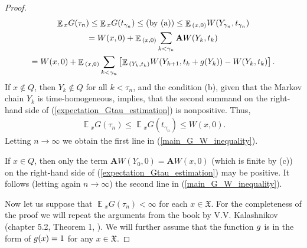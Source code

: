 \documentclass[10pt, reqno]{amsart}
\theoremstyle{definition}
\newcommand{\aasVar}{Q} %
\newcommand{\astVar}{\tau} %
\newcommand{\gtfVar}{G} %
\newcommand{\wtfVar}{W} %
\newcommand{\atoVar}{\mathbf{A}} %
\newcommand{\assVar}{\mathfrak{X}} %
\DeclareMathOperator*{\E}{\mathbb{E}}
\begin{document}
\begin{proof}
		\begin{gather}
		\E{}_{x}\gtfVar(\astVar_{n}) \leq \E{}_{x}\gtfVar(t_{\gamma_{n}}) \leq \text{(by (a))} \leq \E{}_{(x, 0)}\wtfVar(Y_{\gamma_{n}}, t_{\gamma_{n}}) \notag \notag\\ = \wtfVar(x, 0) + \E{}_{(x, 0)}\sum_{k < \gamma_{n}}\atoVar\wtfVar(Y_{k}, t_{k}) \notag\\ = \wtfVar(x, 0) + \E{}_{(x, 0)}\sum_{k < \gamma_{n}}\left[\E{}_{(Y_{k}, t_{k})}\wtfVar(Y_{k+1}, t_{k}+\gffVar(Y_{k})) - \wtfVar(Y_{k}, t_{k})\right].
		\label{expectation_Gtau_estimation}
		\end{gather}
		If $x \notin \aasVar$, then $Y_{k} \notin \aasVar$ for all $k < \astVar_{n}$, and the condition (b), given that the Markov chain $Y_{k}$ is time-homogeneous, implies, that the second summand on the right-hand side of (\ref{expectation_Gtau_estimation}) is nonpositive. Thus,
		\begin{gather*}
		\E{}_{x}\gtfVar(\astVar_{n}) \leq \E{}_{x}\gtfVar(t_{\gamma_{n}}) \leq \wtfVar(x, 0).
		\end{gather*}
		Letting $n \xrightarrow{} \infty$ we obtain the first line in (\ref{main_G_W_inequality}).
		
		If $x \in \aasVar$, then only the term $\atoVar\wtfVar(Y_{0}, 0) = \atoVar\wtfVar(x, 0)$ (which is finite by (c)) on the right-hand side of (\ref{expectation_Gtau_estimation}) may be positive. It follows (letting again $n \xrightarrow{} \infty$) the second line in (\ref{main_G_W_inequality}).
		
		Now let us suppose that $\E{}_{x}\gtfVar(\astVar_{n}) < \infty$ for each $x \in \assVar$. For the completeness of the proof we will repeat the arguments from the book by V.V. Kalashnikov (chapter 5.2, Theorem 1, \cite{Kalashnikov}). We will further assume that the function $g$ is in the form of $g(x) = 1$ for any $x \in \assVar$.
		

\end{proof}
\end{document}
